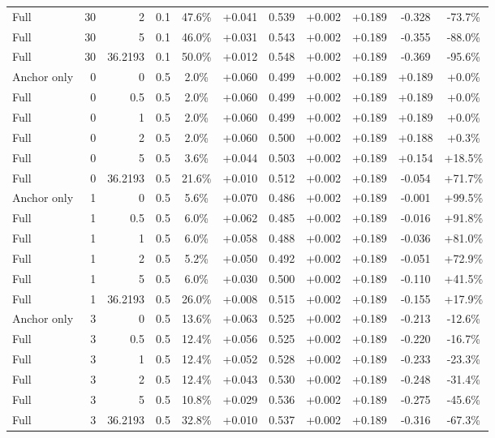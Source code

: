 \begin{table}[htbp]
\begin{tabular}{lrrrccccccc}
Full & 30 & 2 & 0.1 & 47.6\% & +0.041 & 0.539 & +0.002 & +0.189 & -0.328 & -73.7\% \\
Full & 30 & 5 & 0.1 & 46.0\% & +0.031 & 0.543 & +0.002 & +0.189 & -0.355 & -88.0\% \\
Full & 30 & 36.2193 & 0.1 & 50.0\% & +0.012 & 0.548 & +0.002 & +0.189 & -0.369 & -95.6\% \\
Anchor only & 0 & 0 & 0.5 & 2.0\% & +0.060 & 0.499 & +0.002 & +0.189 & +0.189 & +0.0\% \\
Full & 0 & 0.5 & 0.5 & 2.0\% & +0.060 & 0.499 & +0.002 & +0.189 & +0.189 & +0.0\% \\
Full & 0 & 1 & 0.5 & 2.0\% & +0.060 & 0.499 & +0.002 & +0.189 & +0.189 & +0.0\% \\
Full & 0 & 2 & 0.5 & 2.0\% & +0.060 & 0.500 & +0.002 & +0.189 & +0.188 & +0.3\% \\
Full & 0 & 5 & 0.5 & 3.6\% & +0.044 & 0.503 & +0.002 & +0.189 & +0.154 & +18.5\% \\
Full & 0 & 36.2193 & 0.5 & 21.6\% & +0.010 & 0.512 & +0.002 & +0.189 & -0.054 & +71.7\% \\
Anchor only & 1 & 0 & 0.5 & 5.6\% & +0.070 & 0.486 & +0.002 & +0.189 & -0.001 & +99.5\% \\
Full & 1 & 0.5 & 0.5 & 6.0\% & +0.062 & 0.485 & +0.002 & +0.189 & -0.016 & +91.8\% \\
Full & 1 & 1 & 0.5 & 6.0\% & +0.058 & 0.488 & +0.002 & +0.189 & -0.036 & +81.0\% \\
Full & 1 & 2 & 0.5 & 5.2\% & +0.050 & 0.492 & +0.002 & +0.189 & -0.051 & +72.9\% \\
Full & 1 & 5 & 0.5 & 6.0\% & +0.030 & 0.500 & +0.002 & +0.189 & -0.110 & +41.5\% \\
Full & 1 & 36.2193 & 0.5 & 26.0\% & +0.008 & 0.515 & +0.002 & +0.189 & -0.155 & +17.9\% \\
Anchor only & 3 & 0 & 0.5 & 13.6\% & +0.063 & 0.525 & +0.002 & +0.189 & -0.213 & -12.6\% \\
Full & 3 & 0.5 & 0.5 & 12.4\% & +0.056 & 0.525 & +0.002 & +0.189 & -0.220 & -16.7\% \\
Full & 3 & 1 & 0.5 & 12.4\% & +0.052 & 0.528 & +0.002 & +0.189 & -0.233 & -23.3\% \\
Full & 3 & 2 & 0.5 & 12.4\% & +0.043 & 0.530 & +0.002 & +0.189 & -0.248 & -31.4\% \\
Full & 3 & 5 & 0.5 & 10.8\% & +0.029 & 0.536 & +0.002 & +0.189 & -0.275 & -45.6\% \\
Full & 3 & 36.2193 & 0.5 & 32.8\% & +0.010 & 0.537 & +0.002 & +0.189 & -0.316 & -67.3\% \\

\end{tabular}
\end{table}

